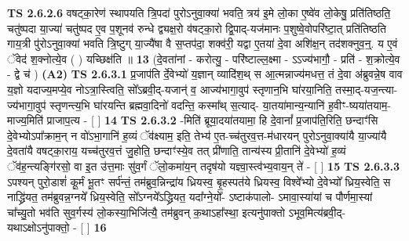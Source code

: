 \documentclass[17pt]{extarticle}
\begin{document}
                  \newline
                                \textbf{ TS 2.6.2.6} \newline
                  वषट्का॒रेण॑ स्थापयति त्रि॒पदा॑ पुरोऽनुवा॒क्या॑ भवति॒ त्रय॑ इ॒मे लो॒का ए॒ष्वे॑व लो॒केषु॒ प्रति॑तिष्ठति॒ चतु॑ष्पदा या॒ज्या॑ चतु॑ष्पद ए॒व प॒शूनव॑ रुन्धे द्व्यक्ष॒रो व॑षट्का॒रो द्वि॒पाद्-यज॑मानः प॒शुष्वे॒वोपरि॑ष्टा॒त् प्रति॑तिष्ठति गाय॒त्री पु॑रोऽनुवा॒क्या॑ भवति त्रि॒ष्टुग् या॒ज्यै॑षा वै स॒प्तप॑दा॒ शक्व॑री॒ यद्वा ए॒तया॑ दे॒वा अशि॑क्ष॒न् तद॑शक्नुव॒न्॒. य ए॒वं ॅवेद॑ श॒क्नोत्ये॒व ( ) यच्छिक्ष॑ति ॥ \textbf{  13} \newline
                  \newline
                      (दे॒वता॑नां - करोत्यु॒ - परि॑ष्टाल्ल॒क्ष्मा - ऽऽज्य॑भागौ॒ - प्रति॑ - श॒क्रोत्ये॒व - द्वे च॑ )  \textbf{(A2)} \newline \newline
                                        \textbf{ TS 2.6.3.1} \newline
                  प्र॒जाप॑ति र्दे॒वेभ्यो॑ य॒ज्ञान् व्यादि॑श॒थ् स आ॒त्मन्नाज्य॑मधत्त॒ तं दे॒वा अ॑ब्रुवन्ने॒ष वाव य॒ज्ञो यदाज्य॒मप्ये॒व नोऽत्रा॒स्त्विति॒ सो᳚ऽब्रवी॒द्-यजान्॑ व॒ आज्य॑भागा॒वुप॑ स्तृणान॒भि घा॑रया॒निति॒ तस्मा॒द्-यज॒न्त्या-ज्य॑भागा॒वुप॑ स्तृणन्त्य॒भि घा॑रयन्ति ब्रह्मवा॒दिनो॑ वदन्ति॒ कस्मा᳚थ् स॒त्याद्- या॒तया॑मान्य॒न्यानि॑ ह॒वीꣳ-ष्यया॑तयाम॒-माज्य॒मिति॑ प्राजाप॒त्य - [  ] \textbf{  14} \newline
                  \newline
                                \textbf{ TS 2.6.3.2} \newline
                  -मिति॑ ब्रूया॒दया॑तयामा॒ हि दे॒वानां᳚ प्र॒जाप॑ति॒रिति॒ छन्दाꣳ॑सि दे॒वेभ्योऽपा᳚क्राम॒न् न वो॑ऽभा॒गानि॑ ह॒व्यं ॅव॑क्ष्याम॒ इति॒ तेभ्य॑ ए॒त-च्च॑तुरव॒त्त-म॑धारयन् पुरोऽनुवा॒क्या॑यै या॒ज्या॑यै दे॒वता॑यै वषट्का॒राय॒ यच्च॑तुरव॒त्तं जु॒होति॒ छन्दाꣳ॑स्ये॒व तत् प्री॑णाति॒ तान्य॑स्य प्री॒तानि॑ दे॒वेभ्यो॑ ह॒व्यं ॅव॑ह॒न्त्यङ्गि॑रसो॒ वा इ॒त उ॑त्त॒माः सु॑व॒र्गं ॅलो॒कमा॑य॒न् तदृष॑यो यज्ञ्वा॒स्त्व॑भ्य॒वाय॒न् ते॑ - [  ] \textbf{  15} \newline
                  \newline
                                \textbf{ TS 2.6.3.3} \newline
                  ऽपश्यन् पुरो॒डाशं॑ कू॒र्मं भू॒तꣳ सर्प॑न्तं॒ तम॑ब्रुव॒न्निन्द्रा॑य ध्रियस्व॒ बृ॒हस्पत॑ये ध्रियस्व॒ विश्वे᳚भ्यो दे॒वेभ्यो᳚ ध्रिय॒स्वेति॒ स नाद्ध्रि॑यत॒ तम॑ब्रुवन्न॒ग्नये᳚ ध्रिय॒स्वेति॒ सो᳚ऽग्नये᳚ऽद्ध्रियत॒ यदा᳚ग्ने॒यो᳚- ऽष्टाक॑पालो- ऽमावा॒स्या॑यां च पौर्णमा॒स्यां चा᳚च्यु॒तो भव॑ति सुव॒र्गस्य॑ लो॒कस्या॒भिजि॑त्यै॒ तम॑ब्रुवन् क॒थाऽहा᳚स्था॒ इत्यनु॑पाक्तो ऽभूव॒मित्य॑ब्रवी॒द्-यथाऽक्षोऽनु॑पाक्तो॒ - [  ] \textbf{  16} \newline
\end{document}
